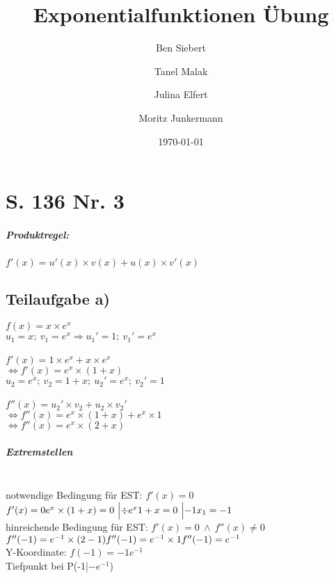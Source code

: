 \documentclass[11pt, a4paper]{report}
\begin{document}
	\bsremovechaptertitle
	\title{Exponentialfunktionen Übung}
	\author{Ben Siebert \and Tanel Malak \and Julina Elfert \and Moritz Junkermann}
	\date{\today}
	\maketitle
	\tableofcontents
	\chapter{S. 136 Nr. 3}
	\paragraph{Produktregel:}
	$f'(x) = u'(x) \times v(x) + u(x) \times v'(x)$
	
	\section{Teilaufgabe a)}
	$f(x) = x \times e^x$ \\
	$u_1 = x;\  v_1 = e^x \Rightarrow u_1' = 1;\ v_1' = e^x $ \\\\
	$f'(x) = 1 \times e^x + x \times e^x$ \\
	$\Leftrightarrow f'(x) = e^x \times (1 + x)$ \\
	$u_2 = e^x;\ v_2 = 1 + x;\ u_2' = e^x;\ v_2' =  1$ \\\\
	$f''(x) = u_2' \times v_2 + u_2 \times v_2'$ \\
	$\Leftrightarrow f''(x) = e^x \times (1+x) + e^x \times 1$ \\
	$\Leftrightarrow f''(x) = e^x \times (2+x)$ \\

	\paragraph{Extremstellen} \mbox{} \\
	notwendige Bedingung für EST: $f'(x) = 0$ \\
	$f'(x) = 0 \\
	e^x \times (1 + x) = 0\ \Bigl|\div e^x \\
	1 + x = 0\ \Bigl| -1 \\
	x_1 = -1
	$
	\\
	hinreichende Bedingung für EST: $f'(x) = 0\ \land\ f''(x) \ne 0 $
	\\
	$
	f''(-1) = e^{-1} \times (2 - 1) \\
	f''(-1) = e^{-1} \times 1 \\
	f''(-1) = e^{-1}
	$
	\\
	Y-Koordinate: $f(-1) = -1e^{-1}$
	\\
	Tiefpunkt bei P(-1|$-e^{-1} $)
	
\end{document}
